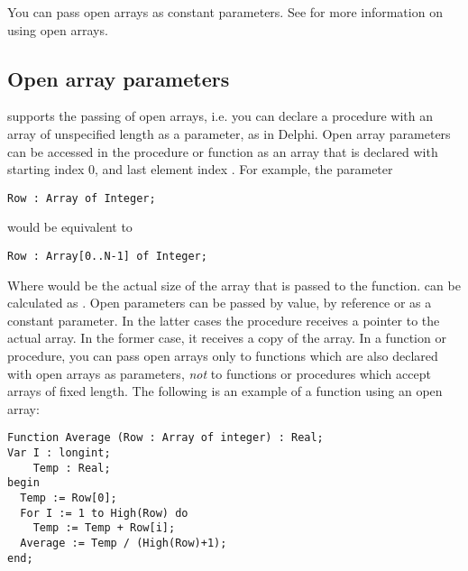 \documentclass{report}
\begin{document}
You can pass open arrays as constant parameters. See  for
more information on using open arrays.
\subsection{Open array parameters}
\label{se:openarray}
\fpc supports the passing of open arrays, i.e. you can declare a procedure
with an array of unspecified length as a parameter, as in Delphi.
Open array parameters can be accessed in the procedure or function as an
array that is declared with starting index 0, and last element
index .
For example, the parameter
\begin{verbatim}
Row : Array of Integer;
\end{verbatim}
would be equivalent to
\begin{verbatim}
Row : Array[0..N-1] of Integer;
\end{verbatim}
Where   would be the actual size of the array that is passed to the
function.  can be calculated as .
Open parameters can be passed by value, by reference or as a constant
parameter. In the latter cases the procedure receives a pointer to the
actual array. In the former case, it receives a copy of the array.
In a function or procedure, you can pass open arrays only to functions which
are also declared with open arrays as parameters, {\em not} to functions or
procedures which accept arrays of fixed length.
The following is an example of a function using an open array:
\begin{verbatim}
Function Average (Row : Array of integer) : Real;
Var I : longint;
    Temp : Real;
begin
  Temp := Row[0];
  For I := 1 to High(Row) do
    Temp := Temp + Row[i];
  Average := Temp / (High(Row)+1);
end;
\end{verbatim}

\end{document}

